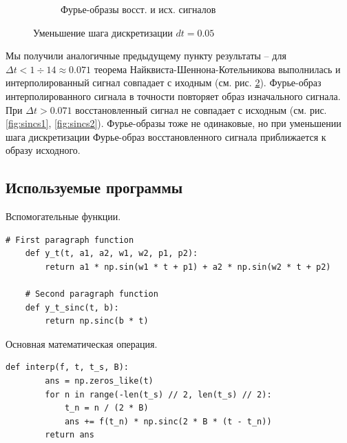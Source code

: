 \documentclass[a4paper, 12pt]{article}
\begin{document}
\begin{figure}[H]
\begin{subfigure}{0.45\textwidth}
            \caption{Фурье-образы восст. и исх. сигналов}
            \label{fig:fisinc3}
        \end{subfigure}
        \caption{Уменьшение шага дискретизации $dt=0.05$}
        \label{fig:sincs3}
    \end{figure}


    Мы получили аналогичные предыдущему пункту результаты -- для $\Delta t < 1\div14\approx0.071$ теорема
    Найквиста-Шеннона-Котельникова выполнилась и интерполированный сигнал совпадает с иходным (см. рис.
    \ref{fig:sincs3}). Фурье-образ интерполированного сигнала в точности повторяет образ изначального сигнала.
    При $\Delta t > 0.071$ восстановленный сигнал не совпадает с исходным
    (см. рис. \ref{fig:sincs1}, \ref{fig:sincs2}). Фурье-образы тоже не одинаковые, но при уменьшении шага дискретизации Фурье-образ
    восстановленного сигнала приближается к образу исходного.


    \subsection{Используемые программы}
    Вспомогательные функции.
    \begin{lstlisting}[label=code1, caption={Методы для нахождения двух функций из задания 2}]
    # First paragraph function
    def y_t(t, a1, a2, w1, w2, p1, p2):
        return a1 * np.sin(w1 * t + p1) + a2 * np.sin(w2 * t + p2)
    
    # Second paragraph function
    def y_t_sinc(t, b):
        return np.sinc(b * t)
    \end{lstlisting}


    Основная математическая операция.
    \begin{lstlisting}[label=int, caption={Метод для вычисления интерполированного сигнала}]
    def interp(f, t, t_s, B):
        ans = np.zeros_like(t)
        for n in range(-len(t_s) // 2, len(t_s) // 2):
            t_n = n / (2 * B)
            ans += f(t_n) * np.sinc(2 * B * (t - t_n))
        return ans
    \end{lstlisting}
\end{document}

